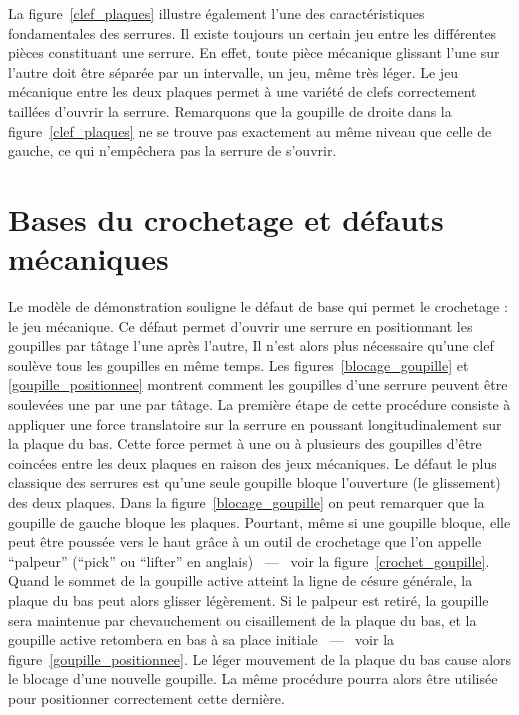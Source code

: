 \documentclass[a4paper,french,11pt,twoside]{report}
\begin{document}
La figure~\vref{clef_plaques} illustre également l'une des caractéristiques fondamentales des serrures. Il existe toujours un certain jeu entre les différentes pièces constituant une serrure. En effet, toute pièce mécanique glissant l'une sur l'autre doit être séparée par un intervalle, un jeu, même très léger. Le jeu mécanique entre les deux plaques permet à une variété de clefs correctement taillées d'ouvrir la serrure. Remarquons que la goupille de droite dans la figure~\vref{clef_plaques} ne se trouve pas exactement au même niveau que celle de gauche, ce qui n'empêchera pas la serrure de s'ouvrir.

\chapter{\label{chap:bases_defauts_mecaniques}Bases du crochetage et défauts mécaniques}

Le modèle de démonstration souligne le défaut de base qui permet le crochetage : le jeu mécanique. Ce défaut permet d'ouvrir une serrure en positionnant les goupilles par tâtage l'une après l'autre, Il n'est alors plus nécessaire qu'une clef soulève tous les goupilles en même temps. Les figures~\vref{blocage_goupille} et \vref{goupille_positionnee} montrent comment les goupilles d'une serrure peuvent être soulevées une par une par tâtage. La première étape de cette procédure consiste à appliquer une force translatoire sur la serrure en poussant longitudinalement sur la plaque du bas. Cette force permet à une ou à plusieurs des goupilles d'être coincées entre les deux plaques en raison des jeux mécaniques. Le défaut le plus classique des serrures est qu'une seule goupille bloque l'ouverture (le glissement) des deux plaques. Dans la figure~\vref{blocage_goupille} on peut remarquer que la goupille de gauche bloque les plaques. Pourtant, même si une goupille bloque, elle peut être poussée vers le haut grâce à un outil de crochetage que l'on appelle \enquote{palpeur} (\enquote{pick} ou \enquote{lifter} en anglais) ~---~ voir la figure~\vref{crochet_goupille}. Quand le sommet de la goupille active atteint la ligne de césure générale, la plaque du bas peut alors glisser légèrement. Si le palpeur est retiré, la goupille sera maintenue par chevauchement ou cisaillement de la plaque du bas, et la goupille active retombera en bas à sa place initiale ~---~ voir la figure~\vref{goupille_positionnee}. Le léger mouvement de la plaque du bas cause alors le blocage d'une nouvelle goupille. La même procédure pourra alors être utilisée pour positionner correctement cette dernière.
\end{document}
